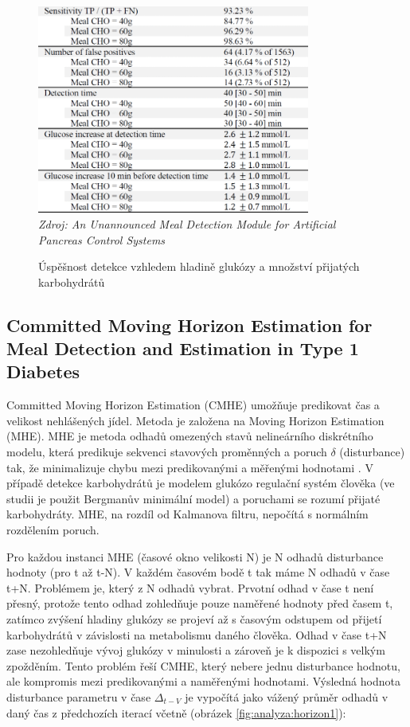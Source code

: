 \begin{figure}[H]
\caption{Úspěšnost detekce vzhledem hladině glukózy a množství přijatých karbohydrátů}
\label{fig:analyza:nekonzistence}
\includegraphics[width=0.8\textwidth]{img/analyzaCHO/nekonzistence.png}\\
\textit{Zdroj: An Unannounced Meal Detection Module for Artificial Pancreas Control Systems \citep{analyzaCHO.Nekonzistence}}
\end{figure}


\subsection{Committed Moving Horizon Estimation for Meal Detection and Estimation in Type 1 Diabetes}
\label{ch:analyzaCHO:horizon}

Committed Moving Horizon Estimation (CMHE) \citep{analyzaCHO.MovingHorizon} umožňuje predikovat čas a velikost nehlášených jídel. Metoda je založena na Moving Horizon Estimation (MHE). MHE je metoda odhadů omezených stavů nelineárního diskrétního modelu, která predikuje sekvenci stavových proměnných a poruch $\delta$ (disturbance) tak, že minimalizuje chybu mezi predikovanými a měřenými hodnotami \citep{analyzaCHO.MovingHorizon}. V případě detekce karbohydrátů je modelem glukózo regulační systém člověka (ve studii je použit Bergmanův minimální model) a poruchami se rozumí přijaté karbohydráty. MHE, na rozdíl od Kalmanova filtru, nepočítá s normálním rozdělením poruch. 

Pro každou instanci MHE (časové okno velikosti N) je N odhadů disturbance hodnoty (pro t až t-N). V každém časovém bodě t tak máme N odhadů v čase t+N. Problémem je, který z N odhadů vybrat. Prvotní odhad v čase t není přesný, protože tento odhad zohledňuje pouze naměřené hodnoty před časem t, zatímco zvýšení hladiny glukózy se projeví až s časovým odstupem od přijetí karbohydrátů v závislosti na metabolismu daného člověka. Odhad v čase t+N zase nezohledňuje vývoj glukózy v minulosti a zároveň je k dispozici s velkým zpožděním. Tento problém řeší CMHE, který nebere jednu disturbance hodnotu, ale kompromis mezi predikovanými a naměřenými hodnotami. Výsledná hodnota disturbance parametru v čase $\Delta_{t-V}$ je vypočítá jako vážený průměr odhadů v daný čas z předchozích iterací včetně (obrázek \ref{fig:analyza:horizon1}):

